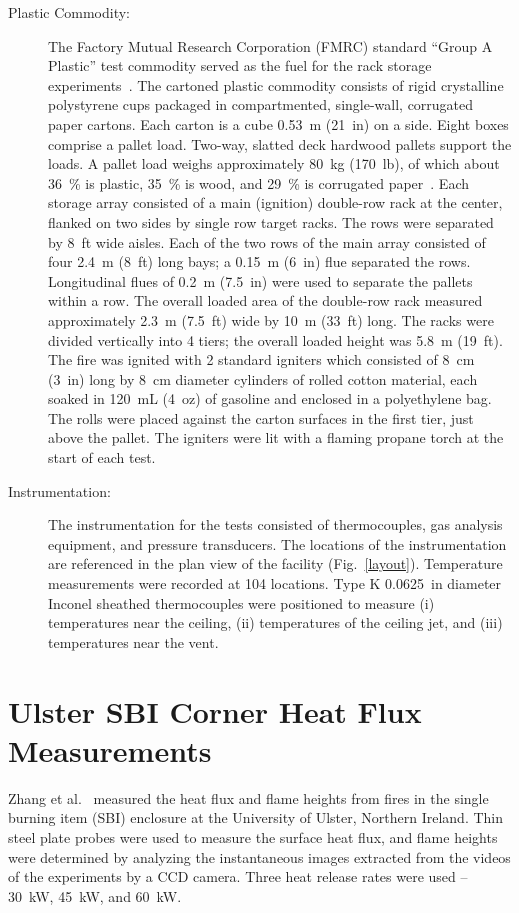 \begin{description}
\item[Plastic Commodity:] The Factory Mutual Research Corporation (FMRC) standard ``Group A Plastic'' test commodity served as the fuel for the rack storage experiments~\cite{Troup:1}. The cartoned plastic commodity consists of rigid crystalline polystyrene cups packaged in compartmented, single-wall, corrugated paper cartons. Each carton is a cube 0.53~m (21~in) on a side. Eight boxes comprise a pallet load. Two-way, slatted deck hardwood pallets support the loads.  A pallet load weighs approximately 80~kg (170~lb), of which about 36~\% is plastic, 35~\% is wood, and 29~\% is corrugated paper~\cite{Troup:1}. Each storage array consisted of a main (ignition) double-row rack at the center, flanked on two sides by single row target racks. The rows were separated by 8~ft wide aisles.  Each of the two rows of the main array consisted of four 2.4~m (8~ft) long bays; a 0.15~m (6~in) flue separated the rows. Longitudinal flues of 0.2~m (7.5~in) were used to separate the pallets within a row. The overall loaded area of the double-row rack measured approximately 2.3~m (7.5~ft) wide by 10~m (33~ft) long.  The racks were divided vertically into 4 tiers; the overall loaded height was 5.8~m (19~ft). The fire was ignited with 2 standard igniters which consisted of 8~cm (3~in) long by 8~cm diameter cylinders of rolled cotton material, each soaked in 120~mL (4~oz) of gasoline and enclosed in a polyethylene bag.  The rolls were placed against the carton surfaces in the first tier, just above the pallet. The igniters were lit with a flaming propane torch at the start of each test.
\item[Instrumentation:] The instrumentation for the tests consisted of thermocouples, gas analysis equipment, and pressure transducers. The locations of the instrumentation are referenced in the plan view of the facility (Fig.~\ref{layout}). Temperature measurements were recorded at 104 locations. Type K 0.0625~in diameter Inconel sheathed thermocouples were positioned to measure (i) temperatures near the ceiling, (ii) temperatures of the ceiling jet, and (iii) temperatures near the vent.
\end{description}



\section{Ulster SBI Corner Heat Flux Measurements}

Zhang et al.~\cite{Zhang:IAFSS9} measured the heat flux and flame heights from fires in the single burning item (SBI) enclosure at the University of Ulster, Northern Ireland. Thin steel plate probes were used to measure the surface heat flux, and flame heights were determined by analyzing the instantaneous images extracted from the videos of the experiments by a CCD camera. Three heat release rates were used -- 30~kW, 45~kW, and 60~kW.


